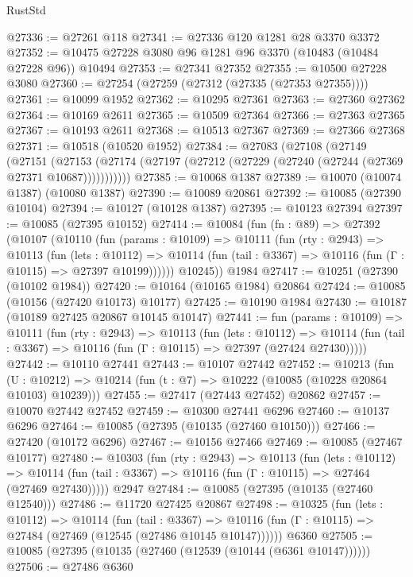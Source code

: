 \begin{lexlean}{RustStd}
\begin{coremodule}
@27336 := @27261 @118
@27341 := @27336 @120 @1281 @28 @3370 @3372
@27352 := @10475 @27228 @3080 @96 @1281 @96 @3370 (@10483 (@10484 @27228 @96)) @10494
@27353 := @27341 @27352
@27355 := @10500 @27228 @3080
@27360 := @27254 (@27259 (@27312 (@27335 (@27353 @27355))))
@27361 := @10099 @1952
@27362 := @10295 @27361
@27363 := @27360 @27362
@27364 := @10169 @2611
@27365 := @10509 @27364
@27366 := @27363 @27365
@27367 := @10193 @2611
@27368 := @10513 @27367
@27369 := @27366 @27368
@27371 := @10518 (@10520 @1952)
@27384 := @27083
    (@27108
      (@27149
        (@27151
          (@27153 (@27174 (@27197 (@27212 (@27229 (@27240 (@27244 (@27369 @27371 @10687)))))))))))
@27385 := @10068 @1387
@27389 := @10070 (@10074 @1387) (@10080 @1387)
@27390 := @10089 @20861
@27392 := @10085 (@27390 @10104)
@27394 := @10127 (@10128 @1387)
@27395 := @10123 @27394
@27397 := @10085 (@27395 @10152)
@27414 := @10084
    (fun (fn : @89) =>
    @27392
      (@10107
        (@10110
          (fun (params : @10109) =>
          @10111
            (fun (rty : @2943) =>
            @10113
              (fun (lets : @10112) =>
              @10114 (fun (tail : @3367) => @10116 (fun (Γ : @10115) => @27397 @10199))))))
        @10245))
    @1984
@27417 := @10251 (@27390 (@10102 @1984))
@27420 := @10164 (@10165 @1984) @20864
@27424 := @10085 (@10156 (@27420 @10173) @10177)
@27425 := @10190 @1984
@27430 := @10187 (@10189 @27425 @20867 @10145 @10147)
@27441 := fun (params : @10109) =>
  @10111
    (fun (rty : @2943) =>
    @10113
      (fun (lets : @10112) =>
      @10114 (fun (tail : @3367) => @10116 (fun (Γ : @10115) => @27397 (@27424 @27430)))))
@27442 := @10110 @27441
@27443 := @10107 @27442
@27452 := @10213
    (fun (U : @10212) => @10214 (fun (t : @7) => @10222 (@10085 (@10228 @20864 @10103) @10239)))
@27455 := @27417 (@27443 @27452) @20862
@27457 := @10070 @27442 @27452
@27459 := @10300 @27441 @6296
@27460 := @10137 @6296
@27464 := @10085 (@27395 (@10135 (@27460 @10150)))
@27466 := @27420 (@10172 @6296)
@27467 := @10156 @27466
@27469 := @10085 (@27467 @10177)
@27480 := @10303
    (fun (rty : @2943) =>
    @10113
      (fun (lets : @10112) =>
      @10114 (fun (tail : @3367) => @10116 (fun (Γ : @10115) => @27464 (@27469 @27430)))))
    @2947
@27484 := @10085 (@27395 (@10135 (@27460 @12540)))
@27486 := @11720 @27425 @20867
@27498 := @10325
    (fun (lets : @10112) =>
    @10114
      (fun (tail : @3367) =>
      @10116 (fun (Γ : @10115) => @27484 (@27469 (@12545 (@27486 @10145 @10147))))))
    @6360
@27505 := @10085 (@27395 (@10135 (@27460 (@12539 (@10144 (@6361 @10147))))))
@27506 := @27486 @6360

\end{coremodule}
\end{lexlean}
